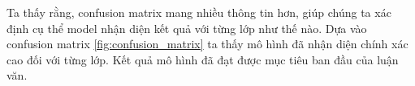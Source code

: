 Ta thấy rằng, confusion matrix mang nhiều thông tin hơn, giúp chúng ta xác định cụ thể model nhận diện kết quả với từng lớp như thế nào. Dựa vào confusion matrix \ref{fig:confusion_matrix} ta thấy mô hình đã nhận diện chính xác cao đối với từng lớp. Kết quả mô hình đã đạt được mục tiêu ban đầu của luận văn.